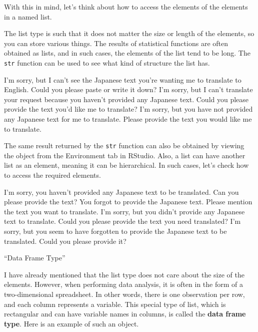 \documentclass[
  a4paper,
]{book}
\begin{document}
With this in mind, let's think about how to access the elements of the
elements in a named list.

The list type is such that it does not matter the size or length of the
elements, so you can store various things. The results of statistical
functions are often obtained as lists, and in such cases, the elements
of the list tend to be long. The \texttt{str} function can be used to
see what kind of structure the list has.

I'm sorry, but I can't see the Japanese text you're wanting me to
translate to English. Could you please paste or write it down? I'm
sorry, but I can't translate your request because you haven't provided
any Japanese text. Could you please provide the text you'd like me to
translate? I'm sorry, but you have not provided any Japanese text for me
to translate. Please provide the text you would like me to translate.

The same result returned by the \texttt{str} function can also be
obtained by viewing the object from the Environment tab in RStudio.
Also, a list can have another list as an element, meaning it can be
hierarchical. In such cases, let's check how to access the required
elements.

I'm sorry, you haven't provided any Japanese text to be translated. Can
you please provide the text? You forgot to provide the Japanese text.
Please mention the text you want to translate. I'm sorry, but you didn't
provide any Japanese text to translate. Could you please provide the
text you need translated? I'm sorry, but you seem to have forgotten to
provide the Japanese text to be translated. Could you please provide it?

``Data Frame Type''

I have already mentioned that the list type does not care about the size
of the elements. However, when performing data analysis, it is often in
the form of a two-dimensional spreadsheet. In other words, there is one
observation per row, and each column represents a variable. This special
type of list, which is rectangular and can have variable names in
columns, is called the \textbf{data frame type}. Here is an example of
such an object.
\end{document}
